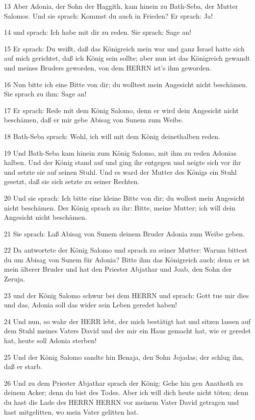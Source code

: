 \par 13 Aber Adonia, der Sohn der Haggith, kam hinein zu Bath-Seba, der Mutter Salomos. Und sie sprach: Kommst du auch in Frieden? Er sprach: Ja!
\par 14 und sprach: Ich habe mit dir zu reden. Sie sprach: Sage an!
\par 15 Er sprach: Du weißt, daß das Königreich mein war und ganz Israel hatte sich auf mich gerichtet, daß ich König sein sollte; aber nun ist das Königreich gewandt und meines Bruders geworden, von dem HERRN ist's ihm geworden.
\par 16 Nun bitte ich eine Bitte von dir; du wolltest mein Angesicht nicht beschämen. Sie sprach zu ihm: Sage an!
\par 17 Er sprach: Rede mit dem König Salomo, denn er wird dein Angesicht nicht beschämen, daß er mir gebe Abisag von Sunem zum Weibe.
\par 18 Bath-Seba sprach: Wohl, ich will mit dem König deinethalben reden.
\par 19 Und Bath-Seba kam hinein zum König Salomo, mit ihm zu reden Adonias halben. Und der König stand auf und ging ihr entgegen und neigte sich vor ihr und setzte sie auf seinen Stuhl. Und es ward der Mutter des Königs ein Stuhl gesetzt, daß sie sich setzte zu seiner Rechten.
\par 20 Und sie sprach: Ich bitte eine kleine Bitte von dir; du wollest mein Angesicht nicht beschämen. Der König sprach zu ihr: Bitte, meine Mutter; ich will dein Angesicht nicht beschämen.
\par 21 Sie sprach: Laß Abisag von Sunem deinem Bruder Adonia zum Weibe geben.
\par 22 Da antwortete der König Salomo und sprach zu seiner Mutter: Warum bittest du um Abisag von Sunem für Adonia? Bitte ihm das Königreich auch; denn er ist mein älterer Bruder und hat den Priester Abjathar und Joab, den Sohn der Zeruja.
\par 23 und der König Salomo schwur bei dem HERRN und sprach: Gott tue mir dies und das, Adonia soll das wider sein Leben geredet haben!
\par 24 Und nun, so wahr der HERR lebt, der mich bestätigt hat und sitzen lassen auf dem Stuhl meines Vaters David und der mir ein Haus gemacht hat, wie er geredet hat, heute soll Adonia sterben!
\par 25 Und der König Salomo sandte hin Benaja, den Sohn Jojadas; der schlug ihn, daß er starb.
\par 26 Und zu dem Priester Abjathar sprach der König: Gehe hin gen Anathoth zu deinem Acker; denn du bist des Todes. Aber ich will dich heute nicht töten; denn du hast die Lade des HERRN HERRN vor meinem Vater David getragen und hast mitgelitten, wo mein Vater gelitten hat.
